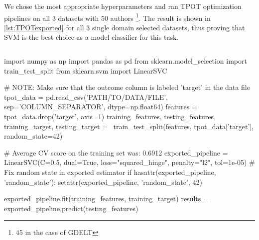 We chose the most appropriate hyperparameters and ran TPOT optimization pipelines on all 3 datasets with 50 authors \footnote{45 in the case of GDELT}. The result is shown in \autoref{lst:TPOTexported} for all 3 single domain selected datasets, thus proving that SVM is the best choice as a model classifier for this task.

\begin{lstlisting}[frame=none,caption={TPOT pipeline extracted.},captionpos=b,label=lst:TPOTexported]
\end{lstlisting}
\begin{python}	
	import numpy as np
	import pandas as pd
	from sklearn.model_selection import train_test_split
	from sklearn.svm import LinearSVC
	
	# NOTE: Make sure that the outcome column is labeled 'target' in the data file
	tpot_data = pd.read_csv('PATH/TO/DATA/FILE', sep='COLUMN_SEPARATOR', dtype=np.float64)
	features = tpot_data.drop('target', axis=1)
	training_features, testing_features, training_target, testing_target = \
	train_test_split(features, tpot_data['target'], random_state=42)
	
	# Average CV score on the training set was: 0.6912
	exported_pipeline = LinearSVC(C=0.5, dual=True, loss="squared_hinge", penalty="l2", tol=1e-05)
	# Fix random state in exported estimator
	if hasattr(exported_pipeline, 'random_state'):
	setattr(exported_pipeline, 'random_state', 42)
	
	exported_pipeline.fit(training_features, training_target)
	results = exported_pipeline.predict(testing_features)
\end{python}